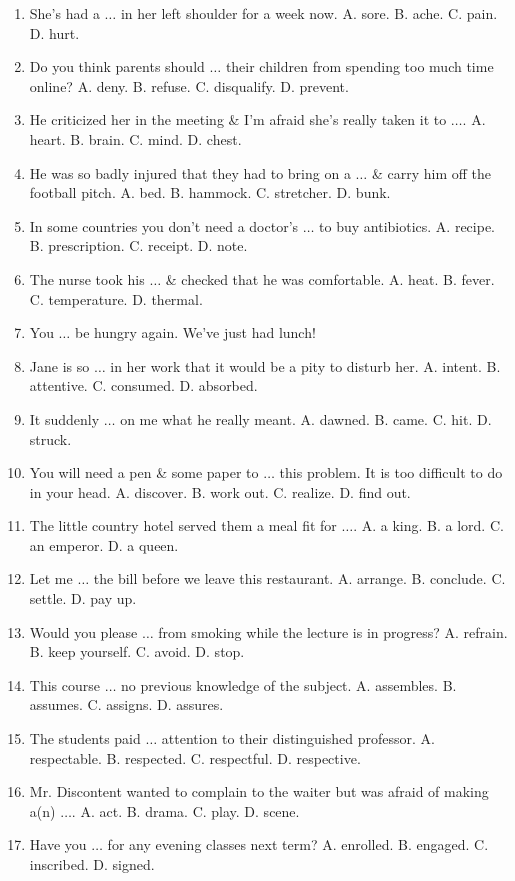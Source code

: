 \documentclass{article}
\numberwithin{equation}{section}
\begin{document}
\begin{enumerate}[leftmargin=2mm]
	\item She's had a $\ldots$ in her left shoulder for a week now. A. sore. B. ache. C. pain. D. hurt.
	\item Do you think parents should $\ldots$ their children from spending too much time online? A. deny. B. refuse. C. disqualify. D. prevent.
	\item He criticized her in the meeting \& I'm afraid she's really taken it to $\ldots$. A. heart. B. brain. C. mind. D. chest.
	\item He was so badly injured that they had to bring on a $\ldots$ \& carry him off the football pitch. A. bed. B. hammock. C. stretcher. D. bunk.
	\item In some countries you don't need a doctor's $\ldots$ to buy antibiotics. A. recipe. B. prescription. C. receipt. D. note.
	\item The nurse took his $\ldots$ \& checked that he was comfortable. A. heat. B. fever. C. temperature. D. thermal.
	\item You $\ldots$ be hungry again. We've just had lunch!
	\item Jane is so $\ldots$ in her work that it would be a pity to disturb her. A. intent. B. attentive. C. consumed. D. absorbed.
	\item It suddenly $\ldots$ on me what he really meant. A. dawned. B. came. C. hit. D. struck.
	\item You will need a pen \& some paper to $\ldots$ this problem. It is too difficult to do in your head. A. discover. B. work out. C. realize. D. find out.
	\item The little country hotel served them a meal fit for $\ldots$. A. a king. B. a lord. C. an emperor. D. a queen.
	\item Let me $\ldots$ the bill before we leave this restaurant. A. arrange. B. conclude. C. settle. D. pay up.
	\item Would you please $\ldots$ from smoking while the lecture is in progress? A. refrain. B. keep yourself. C. avoid. D. stop.
	\item This course $\ldots$ no previous knowledge of the subject. A. assembles. B. assumes. C. assigns. D. assures.
	\item The students paid $\ldots$ attention to their distinguished professor. A. respectable. B. respected. C. respectful. D. respective.
	\item Mr. Discontent wanted to complain to the waiter but was afraid of making a(n) $\ldots$. A. act. B. drama. C. play. D. scene.
	\item Have you $\ldots$ for any evening classes next term? A. enrolled. B. engaged. C. inscribed. D. signed.

\end{enumerate}
\end{document}
